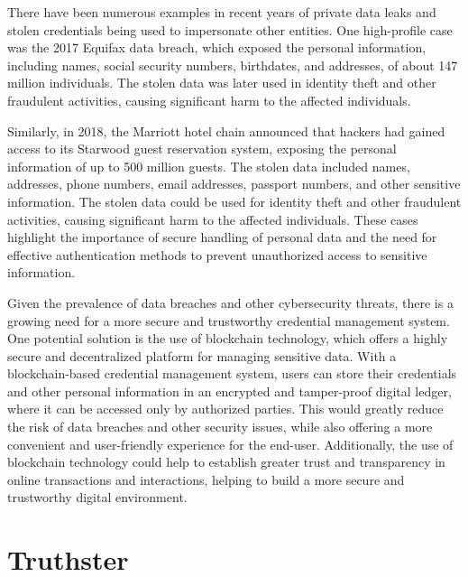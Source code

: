 \documentclass[target=mst,aauheader=]{thud}
\begin{document}
There have been numerous examples in recent years of private data leaks and stolen credentials being used to impersonate other entities. One high-profile case was the 2017 Equifax data breach\cite{equifaxDataBreachSettlement}, which exposed the personal information, including names, social security numbers, birthdates, and addresses, of about 147 million individuals. The stolen data was later used in identity theft and other fraudulent activities, causing significant harm to the affected individuals.\par
Similarly, in 2018, the Marriott hotel chain announced that hackers had gained access to its Starwood guest reservation system\cite{marriotDataBreach}, exposing the personal information of up to 500 million guests. The stolen data included names, addresses, phone numbers, email addresses, passport numbers, and other sensitive information. The stolen data could be used for identity theft and other fraudulent activities, causing significant harm to the affected individuals. These cases highlight the importance of secure handling of personal data and the need for effective authentication methods to prevent unauthorized access to sensitive information.\par
Given the prevalence of data breaches and other cybersecurity threats, there is a growing need for a more secure and trustworthy credential management system. One potential solution is the use of blockchain technology, which offers a highly secure and decentralized platform for managing sensitive data. With a blockchain-based credential management system, users can store their credentials and other personal information in an encrypted and tamper-proof digital ledger, where it can be accessed only by authorized parties. This would greatly reduce the risk of data breaches and other security issues, while also offering a more convenient and user-friendly experience for the end-user. Additionally, the use of blockchain technology could help to establish greater trust and transparency in online transactions and interactions, helping to build a more secure and trustworthy digital environment.


\section{Truthster}
\end{document}
